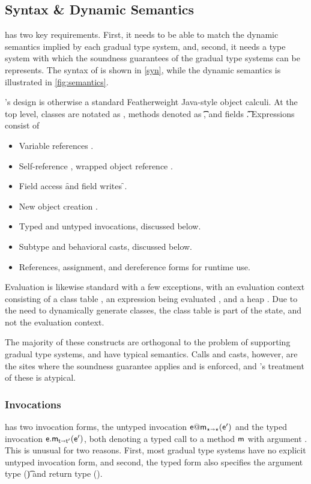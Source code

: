 \documentclass[a4paper,USenglish]{tex/lipics-v2016}
\begin{document}
\subsection{Syntax \& Dynamic Semantics}

\kafka has two key requirements. First, it needs to be able to match the
dynamic semantics implied by each gradual type system, and, second, it needs a
type system with which the soundness guarantees of the gradual type systems
can be represents. The syntax of \kafka is shown in \ref{syn}, while the
dynamic semantics is illustrated in \ref{fig:semantics}.

\kafka's design is otherwise a standard Featherweight Java-style object
calculi. At the top level, classes are notated as \Class{},
methods denoted as \Mdef\m\x\t\t\e, and fields \Fdef\f\t. Expressions consist of
\begin{itemize}
\item Variable references \x.
\item Self-reference \this, wrapped object reference \that.
\item Field access \FRead\f and field writes \FWrite\f\e.
\item New object creation \New{}.
\item Typed and untyped invocations, discussed below.
\item Subtype and behavioral casts, discussed below.
\item References, assignment, and dereference forms for runtime use.
\end{itemize}

Evaluation is likewise standard with a few exceptions, with an evaluation
context consisting of a class table \K, an expression being evaluated \e, and
a heap \s. Due to the need to dynamically generate classes, the class table \K
is part of the state, and not the evaluation context.

The majority of these constructs are orthogonal to the problem of supporting
gradual type systems, and have typical semantics. Calls and casts, however,
are the sites where the soundness guarantee applies and is enforced, and
\kafka's treatment of these is atypical.

\subsubsection{Invocations}

\kafka has two invocation forms, the untyped invocation $\DynCall\e\m\ep$ and
the typed invocation $\KCall\e\m\ep{\t}{\tp}$, both denoting a typed call to a
method ${\sf{m}}$ with argument \ep. This is unusual for two reasons. First, most
gradual type systems have no explicit untyped invocation form, and second, the
typed form also specifies the argument type (\t) and return type (\tp).
\end{document}
